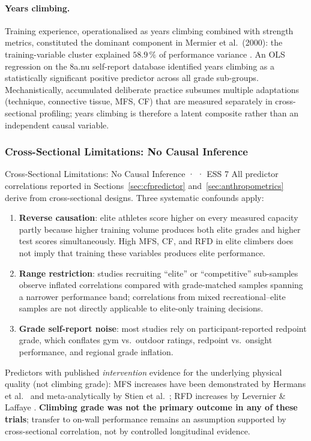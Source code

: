 \paragraph{Years climbing.}
Training experience, operationalised as years climbing combined with strength metrics, constituted the dominant component in Mermier et al.\ (2000): the training-variable cluster explained $58.9\,\%$ of performance variance \cite{MJPS00}.
An OLS regression on the 8a.nu self-report database identified years climbing as a statistically significant positive predictor across all grade sub-groups.
Mechanistically, accumulated deliberate practice subsumes multiple adaptations (technique, connective tissue, MFS, CF) that are measured separately in cross-sectional profiling; years climbing is therefore a latent composite rather than an independent causal variable.

\subsubsection{Cross-Sectional Limitations: No Causal Inference}

\begin{evidencebox}{Cross-Sectional Limitations: No Causal Inference · \evidencebacked · ESS 7}
All predictor correlations reported in Sections~\ref{sec:cfpredictor} and~\ref{sec:anthropometrics} derive from cross-sectional designs.
Three systematic confounds apply:

\begin{enumerate}
  \item \textbf{Reverse causation}: elite athletes score higher on every measured capacity partly because higher training volume produces both elite grades and higher test scores simultaneously.
        High MFS, CF, and RFD in elite climbers does not imply that training these variables produces elite performance.
  \item \textbf{Range restriction}: studies recruiting ``elite'' or ``competitive'' sub-samples observe inflated correlations compared with grade-matched samples spanning a narrower performance band; correlations from mixed recreational--elite samples are not directly applicable to elite-only training decisions.
  \item \textbf{Grade self-report noise}: most studies rely on participant-reported redpoint grade, which conflates gym vs.\ outdoor ratings, redpoint vs.\ onsight performance, and regional grade inflation.
\end{enumerate}

Predictors with published \emph{intervention} evidence for the underlying physical quality (not climbing grade):
MFS increases have been demonstrated by Hermans et al.\ \cite{HO22} and meta-analytically by Stien et al.\ \cite{SO23};
RFD increases by Levernier \& Laffaye \cite{LL19}.
\textbf{Climbing grade was not the primary outcome in any of these trials}; transfer to on-wall performance remains an assumption supported by cross-sectional correlation, not by controlled longitudinal evidence.
\end{evidencebox}
